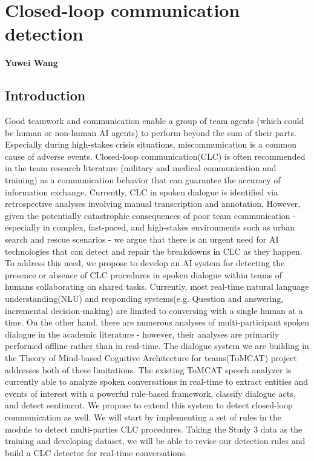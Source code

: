 \chapter{Closed-loop communication detection}
\label{ch:clc}
\textbf{Yuwei Wang}

\section{Introduction}
Good teamwork and communication enable a group of team agents (which could be human or non-human AI agents) to perform beyond the sum of their parts\citep{roberts2022state}. Especially during high-stakes crisis situations, miscommunication is a common cause of adverse events\citep{taylor2014description}\citep{davis2017operative}. Closed-loop communication(CLC) is often recommended in the team research literature (military and medical communication and training) as a communication behavior that can guarantee the accuracy of information exchange\citep{marzuki2019closed}. Currently, CLC in spoken dialogue is identified via retrospective analyses involving manual transcription and annotation. However, given the potentially catastrophic consequences of poor team communication\citep{flin2004identifying} - especially in complex, fast-paced, and high-stakes environments such as urban search and rescue scenarios - we argue that there is an urgent need for AI technologies that can detect and repair the breakdowns in CLC as they happen. To address this need, we propose to develop an AI system for detecting the presence or absence of CLC procedures in spoken dialogue within teams of humans collaborating on shared tasks.
Currently, most real-time natural language understanding(NLU) and responding systems(e.g. Question and answering\citep{hawkins2017you}, incremental decision-making\citep{devault2011detecting}) are limited to conversing with a single human at a time. On the other hand, there are numerous analyses of multi-participant spoken dialogue in the academic literature - however, their analyses are primarily performed offline rather than in real-time. 
The dialogue system we are building in the Theory of Mind-based Cognitive Architecture for teams(ToMCAT) project addresses both of these limitations. The existing ToMCAT speech analyzer is currently able to analyze spoken conversations in real-time to extract entities and events of interest with a powerful rule-based framework\citep{valenzuela-escarcega-etal-2016-odins}, classify dialogue acts, and detect sentiment. We propose to extend this system to detect closed-loop communication as well. We will start by implementing a set of rules in the module to detect multi-parties CLC procedures. Taking the Study 3 data as the training and developing dataset, we will be able to revise our detection rules and build a CLC detector for real-time conversations.

